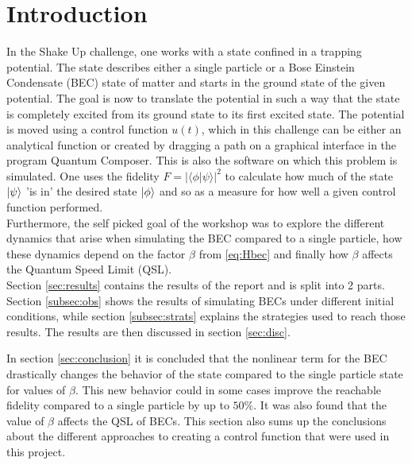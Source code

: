 \documentclass[aps,pra,reprint,superscriptaddress]{revtex4-1}
\begin{document}

\section{Introduction}
In the Shake Up challenge, one works with a state confined in a trapping potential. The state describes either a single particle or a Bose Einstein Condensate (BEC) state of matter and starts in the ground state of the given potential. The goal is now to translate the potential in such a way that the state is completely excited from its ground state to its first excited state. The potential is moved using a control function $u(t)$, which in this challenge can be either an analytical function or created by dragging a path on a graphical interface in the program Quantum Composer. This is also the software on which this problem is simulated. One uses the fidelity $F = | \langle \phi | \psi \rangle |^2$ to calculate how much of the state $\ket{\psi}$ 'is in' the desired state $\ket{\phi}$ and so as a measure for how well a given control function performed.\\

Furthermore, the self picked goal of the workshop was to explore the different dynamics that arise when simulating the BEC compared to a single particle, how these dynamics depend on the factor $\beta$ from \eqref{eq:Hbec} and finally how $\beta$ affects the Quantum Speed Limit (QSL).\\

Section \ref{sec:results} contains the results of the report and is split into 2 parts. Section \ref{subsec:obs} shows the results of simulating BECs under different initial conditions, while section \ref{subsec:strats} explains the strategies used to reach those results. The results are then discussed in section \ref{sec:disc}. 

In section \ref{sec:conclusion} it is concluded that the nonlinear term for the BEC drastically changes the behavior of the state compared to the single particle state for values of $\beta$. This new behavior could in some cases improve the reachable fidelity compared to a single particle by up to $50\%$. It was also found that the value of $\beta$ affects the QSL of BECs. This section also sums up the conclusions about the different approaches to creating a control function that were used in this project.
\end{document}
